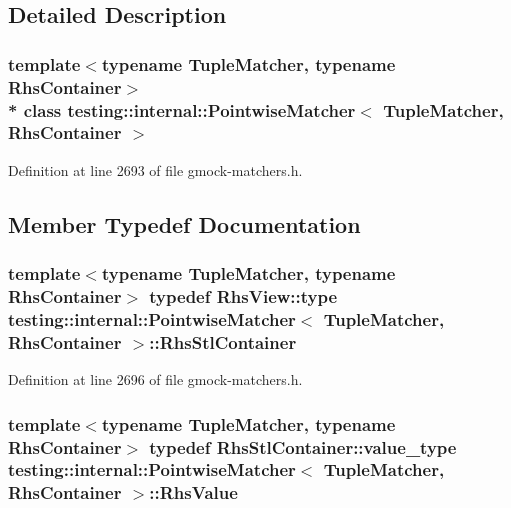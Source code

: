 \subsection{Detailed Description}
\subsubsection*{template$<$typename Tuple\+Matcher, typename Rhs\+Container$>$\\*
class testing\+::internal\+::\+Pointwise\+Matcher$<$ Tuple\+Matcher, Rhs\+Container $>$}



Definition at line 2693 of file gmock-\/matchers.\+h.



\subsection{Member Typedef Documentation}
\subsubsection[{\texorpdfstring{Rhs\+Stl\+Container}{RhsStlContainer}}]{\setlength{\rightskip}{0pt plus 5cm}template$<$typename Tuple\+Matcher, typename Rhs\+Container$>$ typedef {\bf Rhs\+View\+::type} {\bf testing\+::internal\+::\+Pointwise\+Matcher}$<$ Tuple\+Matcher, Rhs\+Container $>$\+::{\bf Rhs\+Stl\+Container}}\hypertarget{classtesting_1_1internal_1_1_pointwise_matcher_aadbaec8c93351f29b103816c2e397edd}{}\label{classtesting_1_1internal_1_1_pointwise_matcher_aadbaec8c93351f29b103816c2e397edd}


Definition at line 2696 of file gmock-\/matchers.\+h.

\subsubsection[{\texorpdfstring{Rhs\+Value}{RhsValue}}]{\setlength{\rightskip}{0pt plus 5cm}template$<$typename Tuple\+Matcher, typename Rhs\+Container$>$ typedef Rhs\+Stl\+Container\+::value\+\_\+type {\bf testing\+::internal\+::\+Pointwise\+Matcher}$<$ Tuple\+Matcher, Rhs\+Container $>$\+::{\bf Rhs\+Value}}\hypertarget{classtesting_1_1internal_1_1_pointwise_matcher_a9f7f1abbfa795033e1e1c1df385b4617}{}\label{classtesting_1_1internal_1_1_pointwise_matcher_a9f7f1abbfa795033e1e1c1df385b4617}


